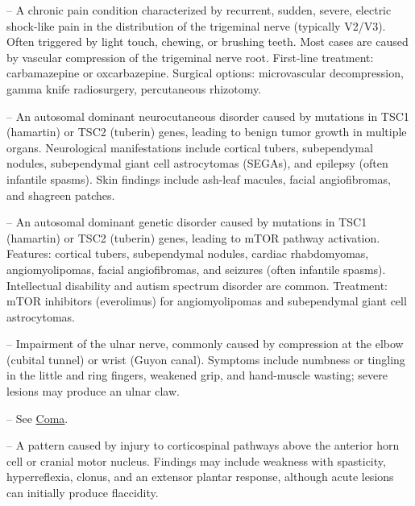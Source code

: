 -- A chronic pain condition characterized by recurrent, sudden, severe, electric shock-like pain in the distribution of the trigeminal nerve (typically V2/V3). Often triggered by light touch, chewing, or brushing teeth. Most cases are caused by vascular compression of the trigeminal nerve root. First-line treatment: carbamazepine or oxcarbazepine. Surgical options: microvascular decompression, gamma knife radiosurgery, percutaneous rhizotomy.

-- An autosomal dominant neurocutaneous disorder caused by mutations in TSC1 (hamartin) or TSC2 (tuberin) genes, leading to benign tumor growth in multiple organs. Neurological manifestations include cortical tubers, subependymal nodules, subependymal giant cell astrocytomas (SEGAs), and epilepsy (often infantile spasms). Skin findings include ash-leaf macules, facial angiofibromas, and shagreen patches.

-- An autosomal dominant genetic disorder caused by mutations in TSC1 (hamartin) or TSC2 (tuberin) genes, leading to mTOR pathway activation. Features: cortical tubers, subependymal nodules, cardiac rhabdomyomas, angiomyolipomas, facial angiofibromas, and seizures (often infantile spasms). Intellectual disability and autism spectrum disorder are common. Treatment: mTOR inhibitors (everolimus) for angiomyolipomas and subependymal giant cell astrocytomas.

-- Impairment of the ulnar nerve, commonly caused by compression at the elbow (cubital tunnel) or wrist (Guyon canal). Symptoms include numbness or tingling in the little and ring fingers, weakened grip, and hand-muscle wasting; severe lesions may produce an ulnar claw.

-- See \hyperlink{Coma}{Coma}.

-- A pattern caused by injury to corticospinal pathways above the anterior horn cell or cranial motor nucleus. Findings may include weakness with spasticity, hyperreflexia, clonus, and an extensor plantar response, although acute lesions can initially produce flaccidity.

